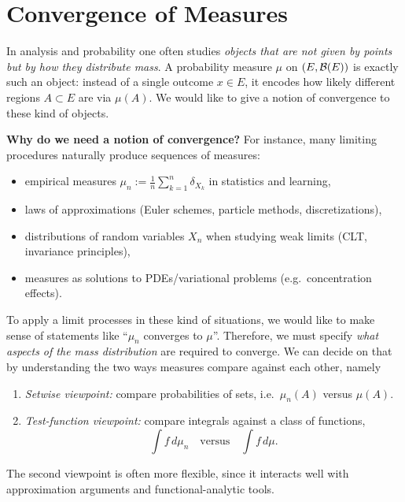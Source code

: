 \chapter{Convergence of Measures}

In analysis and probability one often studies \emph{objects that are not given by points but by how they distribute mass}.
A probability measure $\mu$ on $(E,\mathcal{B}(E))$ is exactly such an object: instead of a single outcome $x\in E$, it encodes
how likely different regions $A\subset E$ are via $\mu(A)$. We would like to give a notion of convergence to these kind of objects.

\medskip

\noindent
\textbf{Why do we need a notion of convergence?}
For instance, many limiting procedures naturally produce sequences of measures:
\begin{itemize}
\item empirical measures $\mu_n:=\frac1n\sum_{k=1}^n \delta_{X_k}$ in statistics and learning,
\item laws of approximations (Euler schemes, particle methods, discretizations),
\item distributions of random variables $X_n$ when studying weak limits (CLT, invariance principles),
\item measures as solutions to PDEs/variational problems (e.g.\ concentration effects).
\end{itemize}
To apply a limit processes in these kind of situations, we would like to make sense of statements like ``$\mu_n$ converges to $\mu$''. Therefore, we must specify \emph{what aspects of the mass distribution}
are required to converge. We can decide on that by understanding the two ways  measures compare against each other, namely
\begin{enumerate}[label=(\roman*)]
\item \emph{Setwise viewpoint:} compare probabilities of sets, i.e.\ $\mu_n(A)$ versus $\mu(A)$.
\item \emph{Test-function viewpoint:} compare integrals against a class of functions,
\[
\int f\,d\mu_n \quad \text{versus} \quad \int f\,d\mu.
\]
\end{enumerate}
The second viewpoint is often more flexible, since it interacts well with approximation arguments and functional-analytic tools.

\medskip

